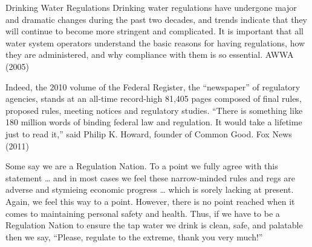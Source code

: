 \documentclass{article}
\begin{document}
Drinking Water Regulations Drinking water regulations have undergone
major and dramatic changes during the past two decades, and trends
indicate that they will continue to become more stringent and
complicated. It is important that all water system operators understand
the basic reasons for having regulations, how they are administered, and
why compliance with them is so essential. AWWA (2005)

Indeed, the 2010 volume of the Federal Register, the ``newspaper'' of
regulatory agencies, stands at an all-time record-high 81,405 pages
composed of final rules, proposed rules, meeting notices and regulatory
studies. ``There is something like 180 million words of binding federal
law and regulation. It would take a lifetime just to read it,'' said
Philip K. Howard, founder of Common Good. Fox News (2011)

Some say we are a Regulation Nation. To a point we fully agree with this
statement \ldots{} and in most cases we feel these narrow-minded rules
and regs are adverse and stymieing economic progress \ldots{} which is
sorely lacking at present. Again, we feel this way to a point. However,
there is no point reached when it comes to maintaining personal safety
and health. Thus, if we have to be a Regulation Nation to ensure the tap
water we drink is clean, safe, and palatable then we say, ``Please,
regulate to the extreme, thank you very much!''
\end{document}

